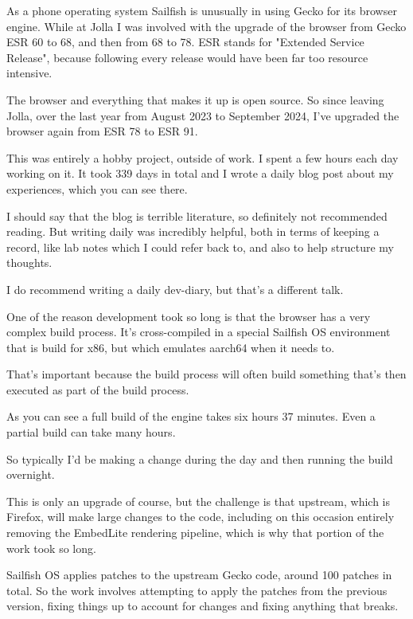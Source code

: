 \documentclass{article}
\begin{document}
As a phone operating system Sailfish is unusually in using Gecko for its browser engine. While at Jolla I was involved with the upgrade of the browser from Gecko ESR 60 to 68, and then from 68 to 78. ESR stands for "Extended Service Release", because following every release would have been far too resource intensive.

The browser and everything that makes it up is open source. So since leaving Jolla, over the last year from August 2023 to September 2024, I've upgraded the browser again from ESR 78 to ESR 91.

This was entirely a hobby project, outside of work. I spent a few hours each day working on it. It took 339 days in total and I wrote a daily blog post about my experiences, which you can see there.

I should say that the blog is terrible literature, so definitely not recommended reading. But writing daily was incredibly helpful, both in terms of keeping a record, like lab notes which I could refer back to, and also to help structure my thoughts.

I do recommend writing a daily dev-diary, but that's a different talk.

One of the reason development took so long is that the browser has a very complex build process. It's cross-compiled in a special Sailfish OS environment that is build for x86, but which emulates aarch64 when it needs to.

That's important because the build process will often build something that's then executed as part of the build process.

As you can see a full build of the engine takes six hours 37 minutes. Even a partial build can take many hours.

So typically I'd be making a change during the day and then running the build overnight.

This is only an upgrade of course, but the challenge is that upstream, which is Firefox, will make large changes to the code, including on this occasion entirely removing the EmbedLite rendering pipeline, which is why that portion of the work took so long.

Sailfish OS applies patches to the upstream Gecko code, around 100 patches in total. So the work involves attempting to apply the patches from the previous version, fixing things up to account for changes and fixing anything that breaks.

\end{document}

